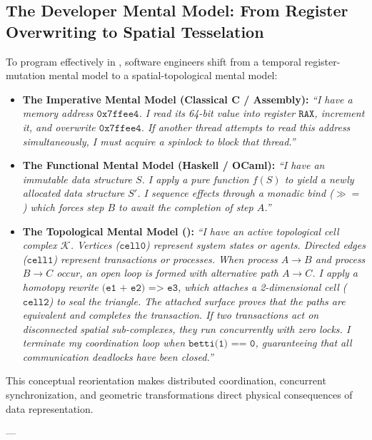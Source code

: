 \subsection{The Developer Mental Model: From Register Overwriting to Spatial Tesselation}
\label{subsec:mental_model}

To program effectively in \ToposLang{}, software engineers shift from a temporal register-mutation mental model to a spatial-topological mental model:

\begin{itemize}[leftmargin=1.2cm]
    \item \textbf{The Imperative Mental Model (Classical C / Assembly):}  
    \textit{``I have a memory address $\texttt{0x7ffee4}$. I read its 64-bit value into register $\texttt{RAX}$, increment it, and overwrite $\texttt{0x7ffee4}$. If another thread attempts to read this address simultaneously, I must acquire a spinlock to block that thread.''}
    
    \item \textbf{The Functional Mental Model (Haskell / OCaml):}  
    \textit{``I have an immutable data structure $S$. I apply a pure function $f(S)$ to yield a newly allocated data structure $S'$. I sequence effects through a monadic bind ($\gg=$) which forces step $B$ to await the completion of step $A$.''}

    \item \textbf{The Topological Mental Model (\ToposLang{}):}  
    \textit{``I have an active topological cell complex $\mathcal{K}$. Vertices ($\texttt{cell0}$) represent system states or agents. Directed edges ($\texttt{cell1}$) represent transactions or processes. When process $A \to B$ and process $B \to C$ occur, an open loop is formed with alternative path $A \to C$. I apply a homotopy rewrite $\texttt{(e1 + e2) => e3}$, which attaches a 2-dimensional cell ($\texttt{cell2}$) to seal the triangle. The attached surface proves that the paths are equivalent and completes the transaction. If two transactions act on disconnected spatial sub-complexes, they run concurrently with zero locks. I terminate my coordination loop when $\texttt{betti(1) == 0}$, guaranteeing that all communication deadlocks have been closed.''}
\end{itemize}

This conceptual reorientation makes distributed coordination, concurrent synchronization, and geometric transformations direct physical consequences of data representation.

---

